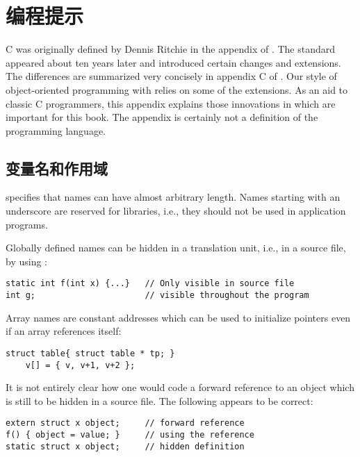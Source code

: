 

\chapter{ 编程提示}
C was originally defined by Dennis Ritchie in the appendix of \cite{KR78}.
The  standard \cite{ANSI} appeared about ten years later and
introduced certain changes and extensions. The differences are summarized
very concisely in appendix C of \cite{KR88}. Our style of object-oriented
programming with  relies on some of the extensions. As an aid
to classic C programmers, this appendix explains those innovations in
 which are important for this book. The appendix is certainly
not a definition of the  programming language.

\section{变量名和作用域}
 specifies that names can have almost arbitrary length. Names
starting with an underscore are reserved for libraries, i.e., they should
not be used in application programs.

Globally defined names can be hidden in a translation unit, i.e., in a
source file, by using :
\begin{lstlisting}
static int f(int x) {...}	// Only visible in source file
int g;						// visible throughout the program
\end{lstlisting}
Array names are constant addresses which can be used to initialize pointers
even if an array references itself:
\begin{lstlisting}
struct table{ struct table * tp; }
	v[] = { v, v+1, v+2 };
\end{lstlisting}
It is not entirely clear how one would code a forward reference to an object
which is still to be hidden in a source file. The following appears to be
correct:
\begin{lstlisting}
extern struct x object;		// forward reference
f() { object = value; }		// using the reference
static struct x object;		// hidden definition
\end{lstlisting}

